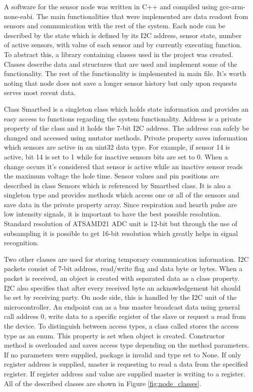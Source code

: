 A software for the sensor node was written in C++ and compiled using gcc-arm-none-eabi. The main functionalities that were implemented are data readout from sensors and communication with the rest of the system. Each node can be described by the state which is defined by its \ac{I2C} address, sensor state, number of active sensors, with value of each sensor and by currently executing function. To abstract this, a library containing classes used in the project was created. Classes describe data and structures that are used and implement some of the functionality. The rest of the functionality is implemented in main file. It's worth noting that node does not save a longer sensor history but only upon requests serves most recent data.

Class Smartbed is a singleton class which holds state information and provides an easy access to functions regarding the system functionality. Address is a private property of the class and it holds the 7-bit \ac{I2C} address. The address can safely be changed and accessed using mutator methods. Private property  saves information which sensors are active in an uint32 data type. For example, if sensor 14 is active, bit 14 is set to 1 while for inactive sensors bits are set to 0. When a change occurs it's considered that sensor is active while an inactive sensor reads the maximum voltage the hole time. Sensor values and pin positions are described in class Sensors which is referenced by Smartbed class. It is also a singleton type and provides methods which access one or all of the sensors and save data in the private property array. Since respiration and hearth pulse are low intensity signals, it is important to have the best possible resolution. Standard resolution of ATSAMD21 \ac{ADC} unit is 12-bit but through the use of subsampling it is possible to get 16-bit resolution which greatly helps in signal recognition.

Two other classes are used for storing temporary communication information. \ac{I2C} packets consist of 7-bit address, read/write flag and data byte or bytes. When a packet is received, an object is created with separated data as a class property. \ac{I2C} also specifies that after every received byte an acknowledgement bit should be set by receiving party. On node side, this is handled by the \ac{I2C} unit of the microcontroller. An endpoint can as a bus master broadcast data using general call address 0, write data to a specific register of the slave or request a read from the device\cite{understanding_i2c}. To distinguish between access types, a class called  stores the access type as an enum. This property is set when object is created. Constructor method is overloaded and saves access type depending on the method parameters. If no parameters were supplied, package is invalid and type set to None. If only register address is supplied, master is requesting to read a data from the specified register. If register address and value are supplied master is writing to a register. All of the described classes are shown in Figure \ref{fig:node_classes}.

